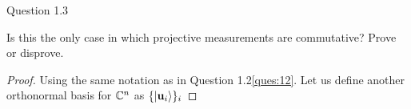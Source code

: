\begin{solution}{Question 1.3}\label{ques:x}
    \begin{question}
    Is this the only case in which projective measurements are commutative? Prove or disprove.
    \end{question}
    \tcblower{}
    \begin{proof}
    Using the same notation as in Question 1.2\ref{ques:12}. Let us define another orthonormal basis for $\mathbb{C}^n$ as 
    $\{\ket{\mathbf{u}_i}\}_i$ 
    \end{proof}
\end{solution}
